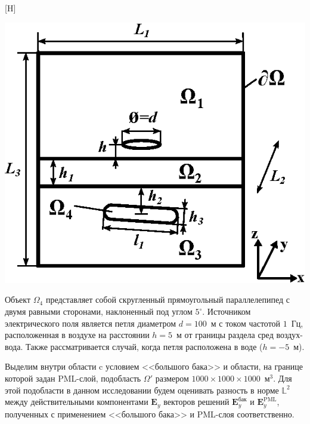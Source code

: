 \documentclass[a4paper,14pt]{article}
\makeatletter
\renewenvironment{figure}[1][\fps@figure]{
  \edef\@tempa{\noexpand\@float{figure}[#1]}
  \@tempa
  \addtocounter{foofigure}{1}
}{
  \end@float
}
\makeatother
\begin{document}
\begin{figure}[H]
	\centering
	\includegraphics[scale=1.5]{research-2/area_3layers/area_3layers_3.eps}
	\caption{расчетная область}
	\label{fig:res2:area}
\end{figure}

Объект $\Omega_4$ представляет собой скругленный прямоугольный параллелепипед с двумя равными сторонами, наклоненный под углом $5^{\circ}$. Источником электрического поля является петля диаметром $d = 100$~м с током частотой $1$~Гц, расположенная в воздухе на расстоянии $h = 5$~м от границы раздела сред воздух-вода. Также рассматривается случай, когда петля расположена в воде ($h = -5$~м).

Выделим внутри области c условием <<большого бака>> и области, на границе которой задан PML-слой, подобласть $\Omega'$ размером $1000 \times 1000 \times 1000$~м${}^3$. Для этой подобласти в данном исследовании будем оценивать разность в норме $\mathbb{L}^2$ между действительными компонентами $\mathbf{E}_y$ векторов решений $\mathbf{E}_y^{\text{бак}}$ и $\mathbf{E}_y^{\text{PML}}$, полученных с применением <<большого бака>> и PML-слоя соответственно.
\end{document}
